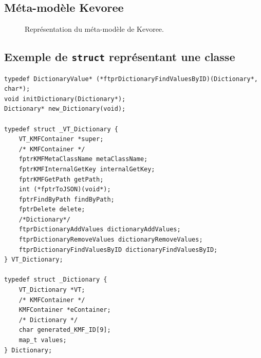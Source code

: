 \begin{landscape}
\subsection{\label{kevoree-full-cd}Méta-modèle Kevoree}
\begin{figure}[ht!]
\centering
\fontsize{1mm}{4mm}\selectfont
\def\svgscale{0.28}

\caption{Représentation du méta-modèle de Kevoree.}
\end{figure}
\end{landscape}


\subsection{\label{dico-struct}Exemple de \texttt{struct} représentant une classe}
\begin{lstlisting}[frame=single]
typedef DictionaryValue* (*ftprDictionaryFindValuesByID)(Dictionary*, char*);
void initDictionary(Dictionary*);
Dictionary* new_Dictionary(void);

typedef struct _VT_Dictionary {
	VT_KMFContainer *super;
	/* KMFContainer */
	fptrKMFMetaClassName metaClassName;
	fptrKMFInternalGetKey internalGetKey;
	fptrKMFGetPath getPath;
	int (*fptrToJSON)(void*);
	fptrFindByPath findByPath;
	fptrDelete delete;
	/*Dictionary*/
	ftprDictionaryAddValues dictionaryAddValues;
	ftprDictionaryRemoveValues dictionaryRemoveValues;
	ftprDictionaryFindValuesByID dictionaryFindValuesByID;
} VT_Dictionary;

typedef struct _Dictionary {
	VT_Dictionary *VT;
	/* KMFContainer */
	KMFContainer *eContainer;
	/* Dictionary */
	char generated_KMF_ID[9];
	map_t values;
} Dictionary;
\end{lstlisting}